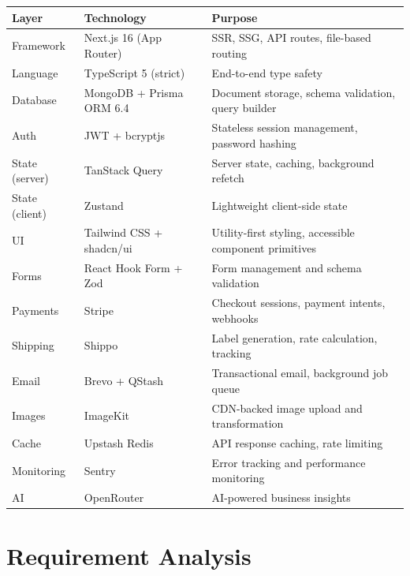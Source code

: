﻿\documentclass[12pt,a4paper]{report}
\begin{document}
\begin{center}
\begin{tabularx}{\textwidth}{llX}
  \toprule
  \textbf{Layer} & \textbf{Technology} & \textbf{Purpose} \\
  \midrule
  Framework    & Next.js 16 (App Router) & SSR, SSG, API routes, file-based routing \\
  Language     & TypeScript 5 (strict)   & End-to-end type safety \\
  Database     & MongoDB + Prisma ORM 6.4 & Document storage, schema validation, query builder \\
  Auth         & JWT + bcryptjs           & Stateless session management, password hashing \\
  State (server) & TanStack Query         & Server state, caching, background refetch \\
  State (client) & Zustand                & Lightweight client-side state \\
  UI           & Tailwind CSS + shadcn/ui & Utility-first styling, accessible component primitives \\
  Forms        & React Hook Form + Zod    & Form management and schema validation \\
  Payments     & Stripe                   & Checkout sessions, payment intents, webhooks \\
  Shipping     & Shippo                   & Label generation, rate calculation, tracking \\
  Email        & Brevo + QStash           & Transactional email, background job queue \\
  Images       & ImageKit                 & CDN-backed image upload and transformation \\
  Cache        & Upstash Redis            & API response caching, rate limiting \\
  Monitoring   & Sentry                   & Error tracking and performance monitoring \\
  AI           & OpenRouter               & AI-powered business insights \\
  \bottomrule
\end{tabularx}
\end{center}

\chapter{Requirement Analysis}
\end{document}
